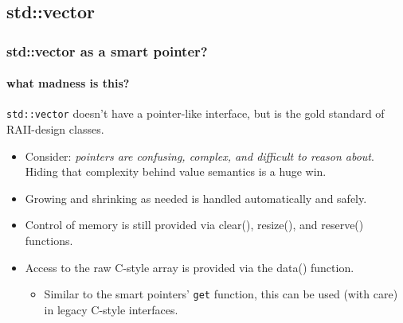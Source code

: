 \subsection{std::vector}

\begin{frame}[fragile]
\frametitle{std::vector as a smart pointer?}
\framesubtitle{what madness is this?}

\texttt{std::vector} doesn't have a pointer-like interface, but is the
gold standard of RAII-design classes.

\begin{itemize}

\item Consider: \emph{pointers are confusing, complex, and difficult
  to reason about}.  Hiding that complexity behind value semantics is
  a huge win.

\item Growing and shrinking as needed is handled automatically and safely.

\item Control of memory is still provided via clear(), resize(), and
  reserve() functions.

\item Access to the raw C-style array is provided via the data()
  function.
\begin{itemize}
  \item Similar to the smart pointers' \texttt{get} function, this can
    be used (with care) in legacy C-style interfaces.
\end{itemize}
\end{itemize}

\end{frame}

